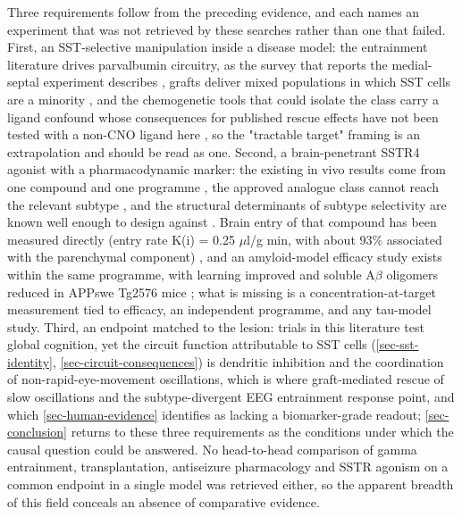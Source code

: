 \documentclass[11pt]{article}
\begin{document}
Three requirements follow from the preceding evidence, and each names an experiment that was not retrieved by these searches rather than one that failed. First, an SST-selective manipulation inside a disease model: the entrainment literature drives parvalbumin circuitry, as the survey that reports the medial-septal experiment describes \citep{Zhang2024a}, grafts deliver mixed populations in which SST cells are a minority \citep{Wang2025a}, and the chemogenetic tools that could isolate the class carry a ligand confound whose consequences for published rescue effects have not been tested with a non-CNO ligand here \citep{Bunce2026}, so the "tractable target" framing is an extrapolation and should be read as one. Second, a brain-penetrant SSTR4 agonist with a pharmacodynamic marker: the existing in vivo results come from one compound and one programme \citep{Sandoval2011,Sandoval2012,Sandoval2013,Sandoval2019}, the approved analogue class cannot reach the relevant subtype \citep{Patel1999}, and the structural determinants of subtype selectivity are known well enough to design against \citep{Zhao2022}. Brain entry of that compound has been measured directly (entry rate K(i) = 0.25 $\mu$l/g min, with about 93\% associated with the parenchymal component) \citep{Sandoval2011}, and an amyloid-model efficacy study exists within the same programme, with learning improved and soluble A$\beta$ oligomers reduced in APPswe Tg2576 mice \citep{Sandoval2013}; what is missing is a concentration-at-target measurement tied to efficacy, an independent programme, and any tau-model study. Third, an endpoint matched to the lesion: trials in this literature test global cognition, yet the circuit function attributable to SST cells (\ref{sec-sst-identity}, \ref{sec-circuit-consequences}) is dendritic inhibition and the coordination of non-rapid-eye-movement oscillations, which is where graft-mediated rescue of slow oscillations \citep{Yokomizo2025b} and the subtype-divergent EEG entrainment response \citep{Chan2025} point, and which \ref{sec-human-evidence} identifies as lacking a biomarker-grade readout; \ref{sec-conclusion} returns to these three requirements as the conditions under which the causal question could be answered. No head-to-head comparison of gamma entrainment, transplantation, antiseizure pharmacology and SSTR agonism on a common endpoint in a single model was retrieved either, so the apparent breadth of this field conceals an absence of comparative evidence.
\end{document}
